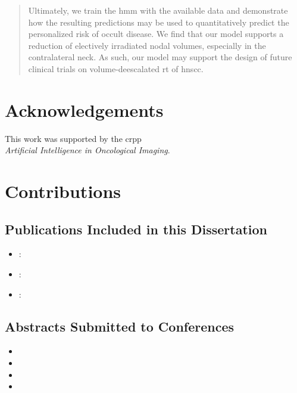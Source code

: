 \documentclass[\relativeRoot/main.tex]{subfiles}
\begin{document}
\begin{abstract}
    Ultimately, we train the \gls{hmm} with the available data and demonstrate how the resulting predictions may be used to quantitatively predict the personalized risk of occult disease. We find that our model supports a reduction of electively irradiated nodal volumes, especially in the contralateral neck. As such, our model may support the design of future clinical trials on volume-deescalated \acrlong{rt} of \gls{hnscc}.
\end{abstract}



\chapter*{Acknowledgements}
\thispagestyle{empty}
This work was supported by the \gls{crpp}\\\emph{Artificial Intelligence in Oncological Imaging}.

\chapter*{Contributions}
\section*{Publications Included in this Dissertation}
\begin{itemize}
    \item {}: 
    \item {}: 
    \item {}: 
\end{itemize}

\section*{Abstracts Submitted to Conferences}
\begin{itemize}
    \item {}
    \item {}
    \item {}
    \item {}
\end{itemize}
\end{document}
